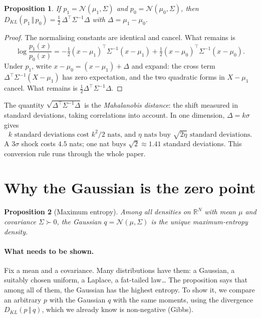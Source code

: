 \documentclass[11pt]{article}
\theoremstyle{plain}
\newtheorem{proposition}{Proposition}[section]
\theoremstyle{definition}
\theoremstyle{remark}
\newcommand{\R}{\mathbb{R}}
\newcommand{\N}{\mathcal{N}}
\newcommand{\KL}[2]{D_{KL}\!\left(#1\,\Vert\,#2\right)}
\begin{document}
\begin{proposition}
\label{prop:klmoy}
If $p_1=\N(\mu_1,\Sigma)$ and $p_0=\N(\mu_0,\Sigma)$, then
$\KL{p_1}{p_0}=\tfrac12\,\Delta^\top\Sigma^{-1}\Delta$ with
$\Delta=\mu_1-\mu_0$.
\end{proposition}

\begin{proof}
The normalising constants are identical and cancel. What remains is
\[
\log\frac{p_1(x)}{p_0(x)}=-\tfrac12(x-\mu_1)^\top\Sigma^{-1}(x-\mu_1)
+\tfrac12(x-\mu_0)^\top\Sigma^{-1}(x-\mu_0).
\]
Under $p_1$, write $x-\mu_0=(x-\mu_1)+\Delta$ and expand: the cross term
$\Delta^\top\Sigma^{-1}(X-\mu_1)$ has zero expectation, and the two quadratic
forms in $X-\mu_1$ cancel. What remains is $\tfrac12\Delta^\top\Sigma^{-1}\Delta$.
\end{proof}

The quantity $\sqrt{\Delta^\top\Sigma^{-1}\Delta}$ is the \emph{Mahalanobis
distance}: the shift measured in standard deviations, taking correlations into
account. In one dimension, $\Delta=k\sigma$ gives
\[
\boxed{\;k\text{ standard deviations cost }k^2/2\text{ nats, and }\eta\text{ nats
buy }\sqrt{2\eta}\text{ standard deviations.}\;}
\]
A $3\sigma$ shock costs $4.5$ nats; one nat buys $\sqrt2\approx1.41$ standard
deviations. This conversion rule runs through the whole paper.

\section{Why the Gaussian is the zero point}
\label{sec:maxent}

\begin{proposition}[Maximum entropy]
\label{prop:maxent}
Among all densities on $\R^N$ with mean $\mu$ and covariance $\Sigma\succ0$,
the Gaussian $q=\N(\mu,\Sigma)$ is the unique maximum-entropy density.
\end{proposition}

\paragraph{What needs to be shown.} Fix a mean and a covariance. Many
distributions have them: a Gaussian, a suitably chosen uniform, a Laplace, a
fat-tailed law\ldots{} The proposition says that among all of them, the
Gaussian has the highest entropy. To show it, we compare an arbitrary $p$ with
the Gaussian $q$ with the same moments, using the divergence $\KL{p}{q}$,
which we already know is non-negative (Gibbs).
\end{document}
